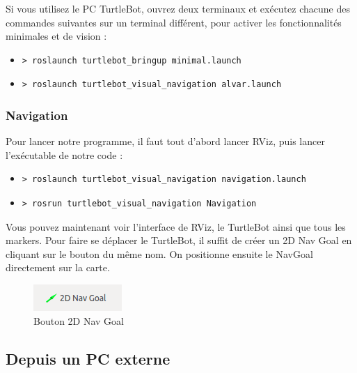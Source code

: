 \documentclass[10pt,a4paper]{article}
\begin{document}
Si vous utilisez le PC TurtleBot, ouvrez deux terminaux et exécutez chacune des commandes suivantes sur un terminal différent, pour activer les fonctionnalités minimales et de vision :

\begin{itemize}
\item[]  \begin{verbatim}> roslaunch turtlebot_bringup minimal.launch \end{verbatim}
\item[]  \begin{verbatim}> roslaunch turtlebot_visual_navigation alvar.launch \end{verbatim}
\end{itemize}

\subsubsection{Navigation}
\label{sec:navigation}

Pour lancer notre programme, il faut tout d'abord lancer RViz, puis lancer l'exécutable de notre code :

\begin{itemize}
\item[] \begin{verbatim}> roslaunch turtlebot_visual_navigation navigation.launch \end{verbatim}
\item[]  \begin{verbatim}> rosrun turtlebot_visual_navigation Navigation \end{verbatim}
\end{itemize}

Vous pouvez maintenant voir l'interface de RViz, le TurtleBot ainsi que tous les markers.
Pour faire se déplacer le TurtleBot, il suffit de créer un 2D Nav Goal en cliquant sur le bouton du même nom. On positionne ensuite le NavGoal directement sur la carte.\\

\begin{figure}[h]
 \center
 \includegraphics[scale=0.6]{2DNavGoal.png}
 \caption{Bouton 2D Nav Goal}
\end{figure}


\subsection{Depuis un PC externe}
\end{document}
